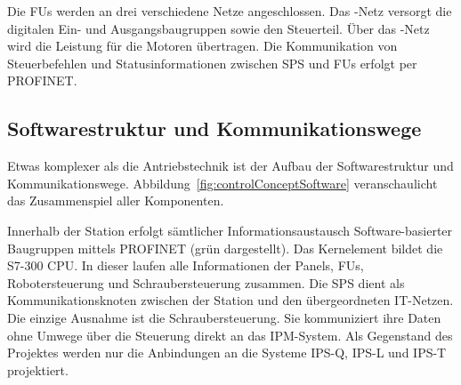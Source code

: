 Die FUs werden an drei verschiedene Netze angeschlossen. Das -Netz versorgt die digitalen Ein- und Ausgangsbaugruppen sowie den Steuerteil. Über das -Netz wird die Leistung für die Motoren übertragen. Die Kommunikation von Steuerbefehlen und Statusinformationen zwischen SPS und FUs erfolgt per PROFINET.

\subsection{Softwarestruktur und Kommunikationswege}


Etwas komplexer als die Antriebstechnik ist der Aufbau der Softwarestruktur und Kommunikationswege. Abbildung~\ref{fig:controlConceptSoftware} veranschaulicht das Zusammenspiel aller Komponenten.

Innerhalb der Station erfolgt sämtlicher Informationsaustausch Software-basierter Baugruppen mittels PROFINET (grün dargestellt). Das Kernelement bildet die S7-300 CPU. In dieser laufen alle Informationen der Panels, FUs, Robotersteuerung und Schraubersteuerung zusammen.
Die SPS dient als Kommunikationsknoten zwischen der Station und den übergeordneten IT-Netzen. Die einzige Ausnahme ist die Schraubersteuerung. Sie kommuniziert ihre Daten ohne Umwege über die Steuerung direkt an das IPM-System.
Als Gegenstand des Projektes werden nur die Anbindungen an die Systeme IPS-Q, IPS-L und IPS-T projektiert.


%
